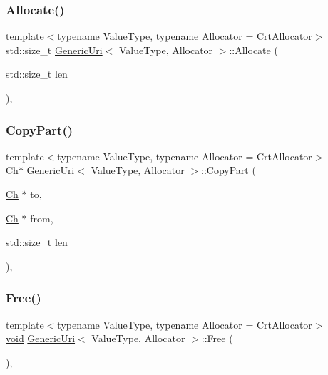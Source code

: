 \subsubsection{\texorpdfstring{Allocate()}{Allocate()}}
{\footnotesize\ttfamily template$<$typename Value\+Type, typename Allocator = Crt\+Allocator$>$ \\
std\+::size\+\_\+t \hyperlink{classGenericUri}{Generic\+Uri}$<$ Value\+Type, Allocator $>$\+::Allocate (\begin{DoxyParamCaption}\item[{std\+::size\+\_\+t}]{len }\end{DoxyParamCaption})\hspace{0.3cm}{\ttfamily [inline]}, {\ttfamily [private]}}

\mbox{\label{classGenericUri_a418f26d11faf27ccdcf3e354abf82be7}} 
\subsubsection{\texorpdfstring{Copy\+Part()}{CopyPart()}}
{\footnotesize\ttfamily template$<$typename Value\+Type, typename Allocator = Crt\+Allocator$>$ \\
\hyperlink{classGenericUri_a20d0602cff62211d89bc4b25963beeee}{Ch}$\ast$ \hyperlink{classGenericUri}{Generic\+Uri}$<$ Value\+Type, Allocator $>$\+::Copy\+Part (\begin{DoxyParamCaption}\item[{\hyperlink{classGenericUri_a20d0602cff62211d89bc4b25963beeee}{Ch} $\ast$}]{to,  }\item[{\hyperlink{classGenericUri_a20d0602cff62211d89bc4b25963beeee}{Ch} $\ast$}]{from,  }\item[{std\+::size\+\_\+t}]{len }\end{DoxyParamCaption})\hspace{0.3cm}{\ttfamily [inline]}, {\ttfamily [private]}}

\mbox{\label{classGenericUri_adf9b1230a24c35979fb6d2ce4ba0a705}} 
\subsubsection{\texorpdfstring{Free()}{Free()}}
{\footnotesize\ttfamily template$<$typename Value\+Type, typename Allocator = Crt\+Allocator$>$ \\
\hyperlink{imgui__impl__opengl3__loader_8h_ac668e7cffd9e2e9cfee428b9b2f34fa7}{void} \hyperlink{classGenericUri}{Generic\+Uri}$<$ Value\+Type, Allocator $>$\+::Free (\begin{DoxyParamCaption}{ }\end{DoxyParamCaption})\hspace{0.3cm}{\ttfamily [inline]}, {\ttfamily [private]}}


